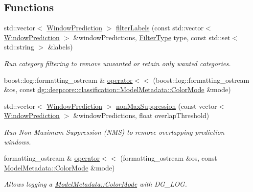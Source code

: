 \subsection*{Functions}
\begin{DoxyCompactItemize}
\item 
std\+::vector$<$ \hyperlink{structdg_1_1deepcore_1_1classification_1_1_window_prediction}{Window\+Prediction} $>$ \hyperlink{group___classification_module_ga099af7f7bc5f6030c39c39f3f8fdcf8d}{filter\+Labels} (const std\+::vector$<$ \hyperlink{structdg_1_1deepcore_1_1classification_1_1_window_prediction}{Window\+Prediction} $>$ \&window\+Predictions, \hyperlink{group___classification_module_ga6915e250f3155525f9d14c0aed87a868}{Filter\+Type} type, const std\+::set$<$ std\+::string $>$ \&labels)
\begin{DoxyCompactList}\small\item\em Run category filtering to remove unwanted or retain only wanted categories. \end{DoxyCompactList}\item 
boost\+::log\+::formatting\+\_\+ostream \& \hyperlink{namespacedg_1_1deepcore_1_1classification_a71edab714c1d4f9c5553d587fd4b4dc2}{operator$<$$<$} (boost\+::log\+::formatting\+\_\+ostream \&os, const \hyperlink{group___classification_module_gafa8e703c3646c5f93ada56f3c811aac7}{dg\+::deepcore\+::classification\+::\+Model\+Metadata\+::\+Color\+Mode} \&mode)
\item 
std\+::vector$<$ \hyperlink{structdg_1_1deepcore_1_1classification_1_1_window_prediction}{Window\+Prediction} $>$ \hyperlink{group___classification_module_ga30426b4ff4fd24cceff0dda284ea4a05}{non\+Max\+Suppression} (const vector$<$ \hyperlink{structdg_1_1deepcore_1_1classification_1_1_window_prediction}{Window\+Prediction} $>$ \&window\+Predictions, float overlap\+Threshold)
\begin{DoxyCompactList}\small\item\em Run Non-\/\+Maximum Suppression (N\+MS) to remove overlapping prediction windows. \end{DoxyCompactList}\item 
formatting\+\_\+ostream \& \hyperlink{group___classification_module_ga2ca3a003d928630b46eed89e774eda35}{operator$<$$<$} (formatting\+\_\+ostream \&os, const \hyperlink{group___classification_module_gafa8e703c3646c5f93ada56f3c811aac7}{Model\+Metadata\+::\+Color\+Mode} \&mode)
\begin{DoxyCompactList}\small\item\em Allows logging a \hyperlink{group___classification_module_gafa8e703c3646c5f93ada56f3c811aac7}{Model\+Metadata\+::\+Color\+Mode} with D\+G\+\_\+\+L\+OG. \end{DoxyCompactList}\end{DoxyCompactItemize}

